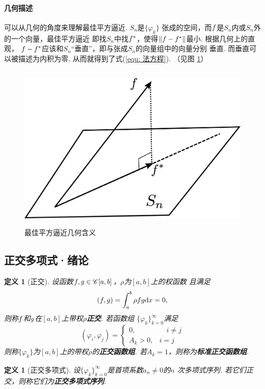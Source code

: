 \documentclass[12pt, a4paper]{article}
\theoremstyle{margin}
\newtheorem{defi}[thm]{定义}
\newcommand{\ms}{\mathscr}
\newcommand{\tbf}{\textbf}
\newcommand{\f}{\mathnormal{f}}
\newcommand{\g}{\mathnormal{g}}
\newcommand{\rd}{\mathrm{d}}
\newcommand\equref[1]{(\ref{#1})}
\newcommand\figref[1]{图 \ref{#1}}
\begin{document}
  \paragraph{几何描述}
    可以从几何的角度来理解最佳平方逼近. $S_n$是$\{\varphi_k\}$
    张成的空间，而$\f$是$S_n$内或$S_n$外的一个向量，最佳平方逼近
    即找$S_n$中找$\f^*$，使得$\|\f-\f^*\|$最小. 根据几何上的直观，
    $\f-\f^*$应该和$S_n$“垂直”，即与张成$S_n$的向量组中的向量分别
    垂直. 而垂直可以被描述为内积为零. 从而就得到了式\equref{equ: 法方程}.
    （见\figref{fig: 最佳平方逼近几何含义}）
    \begin{figure}[htbp]
      \centering
      \includegraphics[height=8cm]{../image/least-square.png}
      \caption{最佳平方逼近几何含义}
      \label{fig: 最佳平方逼近几何含义}
    \end{figure}

\newpage
\subsection{正交多项式·绪论}
  \begin{defi}[正交]
    设函数$\f,\g\in\ms{C}[a, b]$，$\rho$为$[a, b]$上的权函数
    且满足
    \[
      (\f, \g) = \int_a^b\rho\f\g\rd x = 0,
    \]
    则称$\f$和$\g$在$[a, b]$上带权$\rho$\tbf{正交}. 若函数组
    $\{\varphi_k\}_{k=0}^\infty$满足
    \[
      (\varphi_i,\varphi_j) =
      \begin{cases}
        0,&\quad i\ne j \\
        A_k>0,& i=j
      \end{cases}
    \]
    则称$\{\varphi_k\}$为$[a, b]$上的带权$\rho$的\tbf{正交函数组}.
    若$A_k=1$，则称为\tbf{标准正交函数组}.
  \end{defi}

  \begin{defi}[正交多项式]
    设$\{\varphi_k\}_{k=0}^\infty$是首项系数$a_n\ne0$的$n$
    次多项式序列. 若它们正交，则称它们为\tbf{正交多项式序列}.
  \end{defi}
\end{document}
